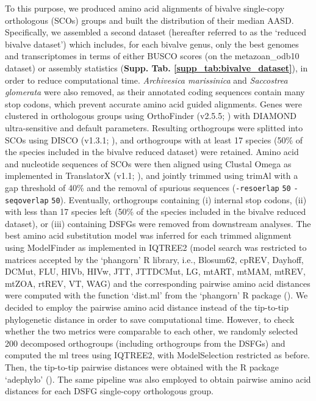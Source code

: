 \documentclass[../main.tex]{subfiles}
\begin{document}
To this purpose, we produced amino acid alignments of bivalve single-copy orthologous (SCOs) groups and built the distribution of their median AASD. Specifically, we assembled a second dataset (hereafter referred to as the ‘reduced bivalve dataset’) which includes, for each bivalve genus, only the best genomes and transcriptomes in terms of either BUSCO scores (on the metazoan\_odb10 dataset) or assembly statistics (\textbf{Supp. Tab. \ref{supp_tab:bivalve_dataset}}), in order to reduce computational time. \textit{Archivesica marissinica} and \textit{Saccostrea glomerata} were also removed, as their annotated coding sequences contain many stop codons, which prevent accurate amino acid guided alignments. Genes were clustered in orthologous groups using OrthoFinder (v2.5.5; \textbf{\cite{emms2019orthofinder}}) with DIAMOND ultra-sensitive and default parameters. Resulting orthogroups were splitted into SCOs using DISCO (v1.3.1; \textbf{\cite{willson2022disco}}), and orthogroups with at least 17 species (50\% of the species included in the bivalve reduced dataset) were retained. Amino acid and nucleotide sequences of SCOs were then aligned using Clustal Omega as implemented in TranslatorX (v1.1; \textbf{\cite{abascal2010translatorx}}), and jointly trimmed using trimAl with a gap threshold of 40\% and the removal of spurious sequences (\verb|-resoerlap| \verb|50| \verb|-seqoverlap| \verb|50|). Eventually, orthogroups containing (i) internal stop codons, (ii) with less than 17 species left (50\% of the species included in the bivalve reduced dataset), or (iii) containing DSFGs were removed from downstream analyses. The best amino acid substitution model was inferred for each trimmed alignment using ModelFinder as implemented in IQTREE2 (model search was restricted to matrices accepted by the ‘phangorn’ R library, i.e., Blosum62, cpREV, Dayhoff, DCMut, FLU, HIVb, HIVw, JTT, JTTDCMut, LG, mtART, mtMAM, mtREV, mtZOA, rtREV, VT, WAG) and the corresponding pairwise amino acid distances were computed with the function ‘dist.ml’ from the ‘phangorn’ R package (\textbf{\cite{schliep2011phangorn}}). We decided to employ the pairwise amino acid distance instead of the tip-to-tip phylogenetic distance in order to save computational time. However, to check whether the two metrics were comparable to each other, we randomly selected 200 decomposed orthogroups (including orthogroups from the DSFGs) and computed the \gls{ml} trees using IQTREE2, with ModelSelection restricted as before. Then, the tip-to-tip pairwise distances were obtained with the R package ‘adephylo’ (\textbf{\cite{jombart2010adephylo}}). The same pipeline was also employed to obtain pairwise amino acid distances for each DSFG single-copy orthologous group.
\end{document}
